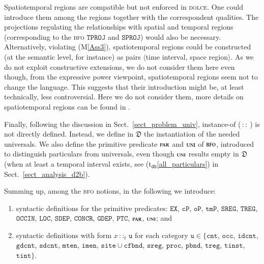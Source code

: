 \documentclass[ao]{iosart2x}
\newcommand{\nb}[1]{\textcolor{red}{$|$}\marginpar{\hspace*{-0cm}\parbox{20mm}{\scriptsize\raggedright\textcolor{red}{#1}}}}
\newcommand{\bflist}{\begin{list}{}{\setlength{\topsep}{2mm}\setlength{\parsep}{0mm}\setlength{\leftmargin}{9.2mm}\setlength{\labelwidth}{8mm}}}
\newcommand{\eflist}{\end{list}}
\newcommand{\dbThrLabel}{\textrm{t$_\texttt{db}$}}
\newcommand{\refdbth}[1]{({\dbThrLabel}\ref{#1})}
\newcommand{\pr}[1]{\mathtt{#1}}
\newcommand{\cn}[1]{\mathtt{#1}}
\newcommand\textequal{%
 \rule[.08ex]{5pt}{0.35pt}\llap{\rule[.78ex]{5pt}{0.35pt}}}
\newcommand{\sdef}{{\hspace{1.5pt}:\hspace{-2.5pt}\textequal\hspace{3pt}}}
\newcommand{\dolce}{{\textsc{dolce}}}
\newcommand{\bfo}{{\textsc{bfo}}}
\newcommand {\thdolce} {\ensuremath{\mathfrak{D}}}
\newcommand {\SLCd} {\ensuremath{\pr{SLC}}}
\newcommand {\TLCd} {\ensuremath{\pr{TLC}}}
\newcommand{\cntbcat}{\cn{cnt}}
\newcommand{\idcntbcat}{\cn{idcnt}}
\newcommand{\gdcntbcat}{\cn{gdcnt}}
\newcommand{\sdcntbcat}{\cn{sdcnt}}
\newcommand{\mtenbcat}{\cn{mten}}
\newcommand{\imenbcat}{\cn{imen}}
\newcommand{\sitebcat}{\cn{site}}
\newcommand{\cfbndbcat}{\cn{cfbnd}}
\newcommand{\sregbcat}{\cn{sreg}}
\newcommand{\occbcat}{\cn{occ}}
\newcommand{\procbcat}{\cn{proc}}
\newcommand{\pbndbcat}{\cn{pbnd}}
\newcommand{\tregbcat}{\cn{treg}}
\newcommand{\tinstbcat}{\cn{tinst}}
\newcommand{\tintbcat}{\cn{tint}}
\newcommand{\bfopartic}{\textsc{par}}
\newcommand{\bfouniv}{\textsc{uni}}
\newcommand{\bfocpart}{\pr{cP}}
\newcommand{\bfoopart}{\pr{oP}}
\newcommand{\bfotpart}{\pr{tmP}}
\newcommand{\bfoexist}{\pr{EX}}
\newcommand{\bfoiof}[1]{{\,::_{#1\:\!}}}
\newcommand{\bfosdep}{\pr{SDEP}}
\newcommand{\bfogdep}{\pr{GDEP}}
\newcommand{\bfooccurs}{\pr{OCCIN}}
\newcommand{\bfolocated}{\pr{LOC}}
\newcommand{\bfosregof}{\pr{SREG}}
\newcommand{\bfosregofocc}{\pr{SREG_O}}
\newcommand{\bfotregof}{\pr{TREG}}
\newcommand{\bfoparticin}{\pr{PTC}}
\newcommand{\bfoconcr}{\pr{CONCR}}
\newcommand{\bfotproj}{\pr{TPROJ}}
\newcommand{\bfosproj}{\pr{SPROJ}}
\begin{document}
Spatiotemporal regions are compatible but not enforced in {\dolce}. One could introduce them among the %
regions together with the correspondent qualities. The projections regulating the relationships with spatial and temporal regions (corresponding to the {\bfo} $\bfotproj$ and $\bfosproj$) would also be necessary.
Alternatively, violating (M\ref{Ass3}), spatiotemporal regions could be constructed (at the semantic level, for instance) as pairs $\langle$time interval, space region$\rangle$. 
%
As we do not exploit constructive extensions, %
we do not consider them here even though, from the expressive power viewpoint, spatiotemporal regions seem not to change the language. This suggests that their introduction might be, at least technically, less controversial. %
Here we do not consider them, more details on spatiotemporal regions can be found in \citep{D24}. %

Finally, following the discussion in Sect.~\ref{sect_problem_univ}, instance-of ($\bfoiof{}$) is not directly defined. Instead, we define in $\thdolce$ the instantiation of the needed universals. We also define the primitive predicate $\bfopartic$ and $\bfouniv$ of $\bfo$, introduced to distinguish particulars from universals, even though $\bfouniv$ results empty in $\thdolce$ (when at least a temporal interval exists, see \refdbth{all_particulars} in Sect.~\ref{sect_analysis_d2b}). %


Summing up, among the {\bfo} notions, in the following we introduce: 
\begin{enumerate}[$(i)$]
\item syntactic definitions for the primitive predicates: $\bfoexist$, $\bfocpart$, $\bfoopart$, $\bfotpart$, $\bfosregof$, $\bfotregof$, $\bfooccurs$, $\bfolocated$, $\bfosdep$, $\bfoconcr$, $\bfogdep$, $\bfoparticin$, $\bfopartic$, $\bfouniv$; and 
\item syntactic definitions with form $x \bfoiof{t} \cn{u}$ for each category $\cn{u} \in \{\cntbcat$, $\occbcat$, $\idcntbcat$, $\gdcntbcat$, $\sdcntbcat$, $\mtenbcat$, $\imenbcat$, $\sitebcat{\cup}\cfbndbcat$, $\sregbcat$, $\procbcat$, $\pbndbcat$, $\tregbcat$, $\tinstbcat$, $\tintbcat\}$.
\end{enumerate}
\end{document}
